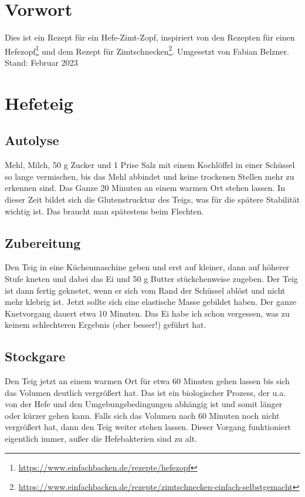 \documentclass[a4paper, oneside]{recipe}
\begin{document}

\section*{Vorwort}
Dies ist ein Rezept für ein Hefe-Zimt-Zopf, inspiriert von den Rezepten für einen Hefezopf\footnote{\url{https://www.einfachbacken.de/rezepte/hefezopf}} und dem Rezept für Zimtschnecken\footnote{\url{https://www.einfachbacken.de/rezepte/zimtschnecken-einfach-selbstgemacht}}. Umgesetzt von Fabian Belzner.\\

Stand: Februar 2023

\section*{Hefeteig}
\subsection*{Autolyse}
Mehl, Milch, 50 g Zucker und 1 Prise Salz mit einem Kochlöffel in einer Schüssel so lange vermischen, bis das Mehl abbindet und keine trockenen Stellen mehr zu erkennen sind. Das Ganze 20 Minuten an einem warmen Ort stehen lassen. In dieser Zeit bildet sich die Glutenstrucktur des Teigs, was für die spätere Stabilität wichtig ist. Das braucht man spätestens beim Flechten.

\subsection*{Zubereitung}
Den Teig in eine Küchenmaschine geben und erst auf kleiner, dann auf höherer Stufe kneten und dabei das Ei und 50 g Butter stückchenweise zugeben. Der Teig ist dann fertig geknetet, wenn er sich vom Rand der Schüssel ablöst und nicht mehr klebrig ist. Jetzt sollte sich eine elastische Masse gebildet haben. Der ganze Knetvorgang dauert etwa 10 Minuten. Das Ei habe ich schon vergessen, was zu keinem schlechteren Ergebnis (eher besser!) geführt hat.

\subsection*{Stockgare}
Den Teig jetzt an einem warmen Ort für etwa 60 Minuten gehen lassen bis sich das Volumen deutlich vergrößert hat. Das ist ein biologischer Prozess, der u.a. von der Hefe und den Umgebungsbedingungen abhängig ist und somit länger oder kürzer gehen kann. Falls sich das Volumen nach 60 Minuten noch nicht vergrößert hat, dann den Teig weiter stehen lassen. Dieser Vorgang funktioniert eigentlich immer, außer die Hefebakterien sind zu alt.
\end{document}
